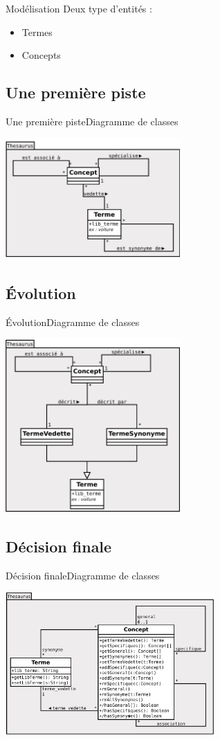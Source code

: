 \begin{frame}{Modélisation}
	Deux type d'entités :
	\begin{itemize}
	\item Termes
	\item Concepts
	\end{itemize}
\end{frame}

\subsection{Une première piste}
\begin{frame}{Une première piste}{Diagramme de classes}
\begin{center}
\includegraphics[width=0.5\textwidth]{files/class_v1}
\end{center}
\end{frame}

\subsection{Évolution}
\begin{frame}{Évolution}{Diagramme de classes}
\begin{center}
\includegraphics[width=0.5\textwidth]{files/class_v2}
\end{center}
\end{frame}

\subsection{Décision finale}
\begin{frame}{Décision finale}{Diagramme de classes}
\begin{center}
\includegraphics[width=0.6\textwidth]{files/class_v3}
\end{center}
\end{frame}
